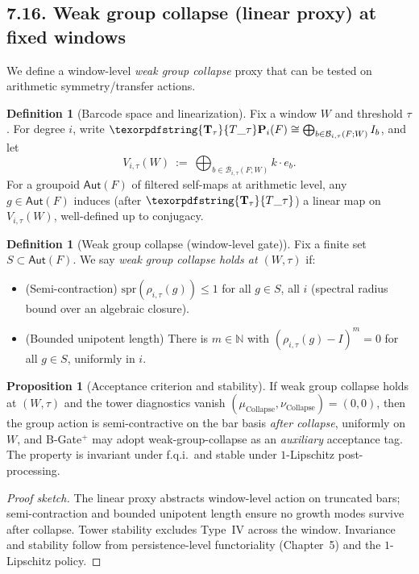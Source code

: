 \documentclass[11pt]{article}
\numberwithin{equation}{section}
\theoremstyle{plain}
\theoremstyle{definition}
\theoremstyle{remark}
\DeclareRobustCommand{\hyp}{\nobreakdash-}
\theoremstyle{plain}
\theoremstyle{definition}
\numberwithin{equation}{section}
\newtheorem{proposition}[theorem]{Proposition}
\theoremstyle{definition}
\newtheorem{definition}[theorem]{Definition}
\DeclareRobustCommand{\Ttau}{\texorpdfstring{\ensuremath{\mathbf{T}_{\tau}}}{T\_\tau}}
\DeclareRobustCommand{\muc}{\mu_{\mathrm{Collapse}}}
\DeclareRobustCommand{\nuc}{\nu_{\mathrm{Collapse}}}
\numberwithin{equation}{section}
\theoremstyle{plain}
\theoremstyle{definition}
\theoremstyle{remark}
\providecommand{\Tfun}[1]{\mathbf{T}_{#1}}
\providecommand{\Ttau}{\Tfun{\tau}}
\providecommand{\muc}{\mu_{\mathrm{Collapse}}}
\providecommand{\nuc}{\nu_{\mathrm{Collapse}}}
\begin{document}
\subsection*{7.16. Weak group collapse (linear proxy) at fixed windows}
We define a window\hyp level \emph{weak group collapse} proxy that can be tested on arithmetic symmetry/transfer actions.

\begin{definition}[Barcode space and linearization]\label{def:barcode-space}
Fix a window \(W\) and threshold \(\tau\). For degree \(i\), write \(\Ttau\mathbf{P}_i(F)\cong \bigoplus_{b\in \mathcal{B}_{i,\tau}(F;W)} I_b\), and let
\[
V_{i,\tau}(W)\ :=\ \bigoplus_{b\in \mathcal{B}_{i,\tau}(F;W)} k\cdot e_b.
\]
For a groupoid \(\mathsf{Aut}(F)\) of filtered self\hyp maps at arithmetic level, any \(g\in \mathsf{Aut}(F)\) induces (after \(\Ttau\)) a linear map on \(V_{i,\tau}(W)\), well\hyp defined up to conjugacy.
\end{definition}

\begin{definition}[Weak group collapse (window\hyp level gate)]\label{def:weak-group}
Fix a finite set \(S\subset \mathsf{Aut}(F)\). We say \emph{weak group collapse holds at \((W,\tau)\)} if:
\begin{itemize}
  \item (Semi\hyp contraction) \(\mathrm{spr}(\rho_{i,\tau}(g))\le 1\) for all \(g\in S\), all \(i\) (spectral radius bound over an algebraic closure).
  \item (Bounded unipotent length) There is \(m\in\mathbb{N}\) with \((\rho_{i,\tau}(g)-I)^m=0\) for all \(g\in S\), uniformly in \(i\).
\end{itemize}
\end{definition}

\begin{proposition}[Acceptance criterion and stability]\label{prop:weak-group-accept}
If weak group collapse holds at \((W,\tau)\) and the tower diagnostics vanish \((\muc,\nuc)=(0,0)\), then the group action is semi\hyp contractive on the bar basis \emph{after collapse}, uniformly on \(W\), and B\hyp Gate$^{+}$ may adopt weak\hyp group\hyp collapse as an \emph{auxiliary} acceptance tag. The property is invariant under f.q.i.\ and stable under $1$\hyp Lipschitz post\hyp processing.
\end{proposition}

\begin{proof}[Proof sketch]
The linear proxy abstracts window\hyp level action on truncated bars; semi\hyp contraction and bounded unipotent length ensure no growth modes survive after collapse. Tower stability excludes Type~IV across the window. Invariance and stability follow from persistence\hyp level functoriality (Chapter~5) and the $1$\hyp Lipschitz policy.
\end{proof}
\end{document}

